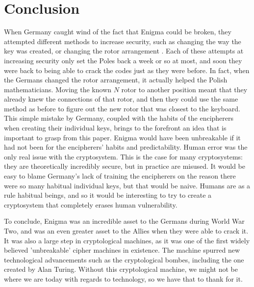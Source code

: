 \chapter{Conclusion}\label{chap:conclusion}

When Germany caught wind of the fact that Enigma could be broken, they attempted different methods to increase security, such as changing the way the key was created, or changing the rotor arrangement \cite{wk85}. Each of these attempts at increasing security only set the Poles back a week or so at most, and soon they were back to being able to crack the codes just as they were before. In fact, when the Germans changed the rotor arrangement, it actually helped the Polish mathematicians. Moving the known $N$ rotor to another position meant that they already knew the connections of that rotor, and then they could use the same method as before to figure out the new rotor that was closest to the keyboard. This simple mistake by Germany, coupled with the habits of the encipherers when creating their individual keys, brings to the forefront an idea that is important to grasp from this paper. Enigma would have been unbreakable if it had not been for the encipherers' habits and predictability. Human error was the only real issue with the cryptosystem. This is the case for many cryptosystems: they are theoretically incredibly secure, but in practice are misused. It would be easy to blame Germany's lack of training the encipherers on the reason there were so many habitual individual keys, but that would be naive. Humans are as a rule habitual beings, and so it would be interesting to try to create a cryptosystem that completely erases human vulnerability.

To conclude, Enigma was an incredible asset to the Germans during World War Two, and was an even greater asset to the Allies when they were able to crack it. It was also a large step in cryptological machines, as it was one of the first widely believed 'unbreakable' cipher machines in existence. The machine spurred new technological advancements such as the cryptological bombes, including the one created by Alan Turing. Without this cryptological machine, we might not be where we are today with regards to technology, so we have that to thank for it.